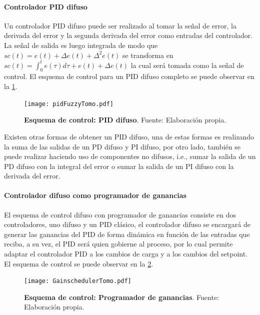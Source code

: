                \pagebreak

            \paragraph{Controlador PID difuso}
                
                Un controlador PID difuso puede ser realizado al tomar la señal de error, la derivada del error y la segunda derivada del error como entradas del controlador. La señal de salida es luego integrada de modo que $sc(t) = e(t) + \Delta e(t) + \Delta^2 e(t)$ se transforma en $sc(t) = \int_0^t e(\tau)d\tau + e(t) + \Delta e(t)$ la cual será tomada como la señal de control. El esquema de control para un PID difuso completo se puede observar en la \cref{fig:pidFuzzyTomo}.

                \begin{figure}[htb]
                    \centering
                    \texttt{[image: pidFuzzyTomo.pdf]}
                    \caption[Esquema de control: PID difuso]{\textbf{Esquema de control: PID difuso}. Fuente: Elaboración propia.} 
                    \label{fig:pidFuzzyTomo}
                \end{figure}

                Existen otras formas de obtener un PID difuso, una de estas formas es realizando la suma de las salidas de un PD difuso y PI difuso, por otro lado, también se puede realizar haciendo uso de componentes no difusos, i.e., sumar la salida de un PD difuso con la integral del error o sumar la salida de un PI difuso con la derivada del error.

            \paragraph{Controlador difuso como programador de ganancias}
                
                El esquema de control difuso con programador de ganancias consiste en dos controladores, uno difuso y un PID clásico, el controlador difuso se encargará de generar las ganancias del PID de forma dinámica en función de las entradas que reciba, a su vez, el PID será quien gobierne al proceso, por lo cual permite adaptar el controlador PID a los cambios de carga y a los cambios del setpoint. El esquema de control se puede observar en la \cref{fig:GainschedulerTomo}.

                \begin{figure}[htb]
                    \centering
                    \texttt{[image: GainschedulerTomo.pdf]}
                    \caption[Esquema de control: Programador de ganancias]{\textbf{Esquema de control: Programador de ganancias}. Fuente: Elaboración propia.} 
                    \label{fig:GainschedulerTomo}
                \end{figure}
            
